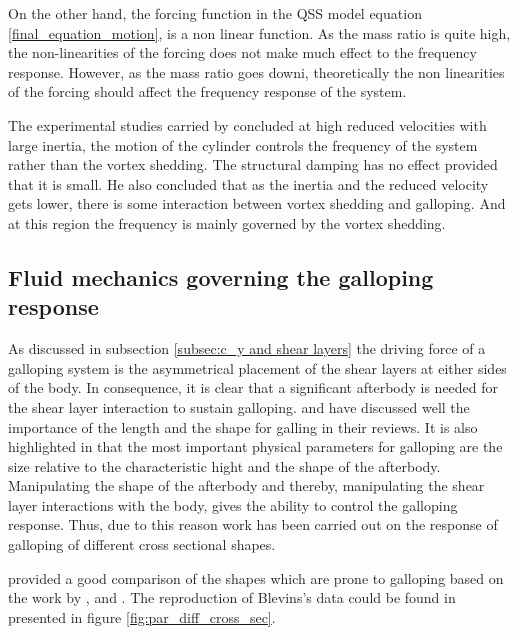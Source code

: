  On the other hand, the forcing function in the QSS model equation \ref{final_equation_motion}, is a non linear function. As the mass ratio is quite high, the non-linearities of the forcing does not make much effect  to the frequency response. However, as the mass ratio goes downi, theoretically the non linearities of the forcing should affect the frequency response of the system.   
 
 The experimental studies carried by \citet{bouclin:77} concluded at high reduced velocities with large inertia, the motion of the cylinder controls the frequency of the system rather than the vortex shedding. The structural damping has no effect provided that it is small. He also concluded that as the inertia and the reduced velocity gets lower, there is some interaction between vortex shedding and galloping. And at this region the frequency is mainly governed by the vortex shedding. 
 
 
 \subsection{Fluid mechanics governing the galloping response}
 
 As discussed in subsection \ref{subsec:c_y and shear layers} the driving force of a galloping system is the asymmetrical placement of the shear layers at either sides of the body. In consequence, it is clear that a significant afterbody is needed for the shear layer interaction to sustain galloping. \citet{Parkinson1974,Parkinson1989} and \citet{Bearman1987} have discussed well the importance of the length and the shape for galling in their reviews. It is also highlighted in \citet{Parkinson1974} that the most important physical parameters for galloping are the size relative to the characteristic hight and the shape of the afterbody. Manipulating the shape of the afterbody and thereby, manipulating the shear layer interactions with the body, gives the ability to control the galloping response. Thus, due to this reason work has been carried out on the response of galloping of different cross sectional shapes. 
 
 \citet{Blevins1990} provided a good comparison of the shapes which are prone to galloping based on the work by \citet{Parkinson1961}, \citet{Nakamura1975a} and \citet{Nakamura1977}. The reproduction of Blevins's data could be found in \citet{Paidoussis2010} presented in figure \ref{fig:par_diff_cross_sec}. 
    
